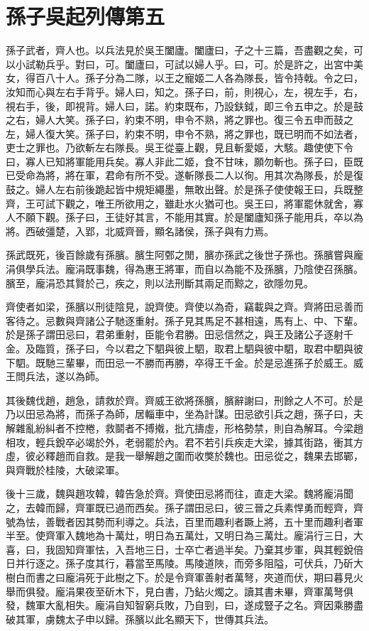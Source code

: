 \chapter{孫子吳起列傳第五}

孫子武者，齊人也。以兵法見於吳王闔廬。闔廬曰，子之十三篇，吾盡觀之矣，可以小試勒兵乎。對曰，可。闔廬曰，可試以婦人乎。曰，可。於是許之，出宮中美女，得百八十人。孫子分為二隊，以王之寵姬二人各為隊長，皆令持戟。令之曰，汝知而心與左右手背乎。婦人曰，知之。孫子曰，前，則視心，左，視左手，右，視右手，後，即視背。婦人曰，諾。約束既布，乃設鈇鉞，即三令五申之。於是鼓之右，婦人大笑。孫子曰，約束不明，申令不熟，將之罪也。復三令五申而鼓之左，婦人復大笑。孫子曰，約束不明，申令不熟，將之罪也，既已明而不如法者，吏士之罪也。乃欲斬左右隊長。吳王從臺上觀，見且斬愛姬，大駭。趣使使下令曰，寡人已知將軍能用兵矣。寡人非此二姬，食不甘味，願勿斬也。孫子曰，臣既已受命為將，將在軍，君命有所不受。遂斬隊長二人以徇。用其次為隊長，於是復鼓之。婦人左右前後跪起皆中規矩繩墨，無敢出聲。於是孫子使使報王曰，兵既整齊，王可試下觀之，唯王所欲用之，雖赴水火猶可也。吳王曰，將軍罷休就舍，寡人不願下觀。孫子曰，王徒好其言，不能用其實。於是闔廬知孫子能用兵，卒以為將。西破彊楚，入郢，北威齊晉，顯名諸侯，孫子與有力焉。

孫武既死，後百餘歲有孫臏。臏生阿鄄之閒，臏亦孫武之後世子孫也。孫臏嘗與龐涓俱學兵法。龐涓既事魏，得為惠王將軍，而自以為能不及孫臏，乃陰使召孫臏。臏至，龐涓恐其賢於己，疾之，則以法刑斷其兩足而黥之，欲隱勿見。

齊使者如梁，孫臏以刑徒陰見，說齊使。齊使以為奇，竊載與之齊。齊將田忌善而客待之。忌數與齊諸公子馳逐重射。孫子見其馬足不甚相遠，馬有上、中、下輩。於是孫子謂田忌曰，君弟重射，臣能令君勝。田忌信然之，與王及諸公子逐射千金。及臨質，孫子曰，今以君之下駟與彼上駟，取君上駟與彼中駟，取君中駟與彼下駟。既馳三輩畢，而田忌一不勝而再勝，卒得王千金。於是忌進孫子於威王。威王問兵法，遂以為師。

其後魏伐趙，趙急，請救於齊。齊威王欲將孫臏，臏辭謝曰，刑餘之人不可。於是乃以田忌為將，而孫子為師，居輜車中，坐為計謀。田忌欲引兵之趙，孫子曰，夫解雜亂紛糾者不控棬，救鬬者不搏撠，批亢擣虛，形格勢禁，則自為解耳。今梁趙相攻，輕兵銳卒必竭於外，老弱罷於內。君不若引兵疾走大梁，據其街路，衝其方虛，彼必釋趙而自救。是我一舉解趙之圍而收獘於魏也。田忌從之，魏果去邯鄲，與齊戰於桂陵，大破梁軍。

後十三歲，魏與趙攻韓，韓告急於齊。齊使田忌將而往，直走大梁。魏將龐涓聞之，去韓而歸，齊軍既已過而西矣。孫子謂田忌曰，彼三晉之兵素悍勇而輕齊，齊號為怯，善戰者因其勢而利導之。兵法，百里而趣利者蹶上將，五十里而趣利者軍半至。使齊軍入魏地為十萬灶，明日為五萬灶，又明日為三萬灶。龐涓行三日，大喜，曰，我固知齊軍怯，入吾地三日，士卒亡者過半矣。乃棄其步軍，與其輕銳倍日并行逐之。孫子度其行，暮當至馬陵。馬陵道陜，而旁多阻隘，可伏兵，乃斫大樹白而書之曰龐涓死于此樹之下。於是令齊軍善射者萬弩，夾道而伏，期曰暮見火舉而俱發。龐涓果夜至斫木下，見白書，乃鉆火燭之。讀其書未畢，齊軍萬弩俱發，魏軍大亂相失。龐涓自知智窮兵敗，乃自剄，曰，遂成豎子之名。齊因乘勝盡破其軍，虜魏太子申以歸。孫臏以此名顯天下，世傳其兵法。

